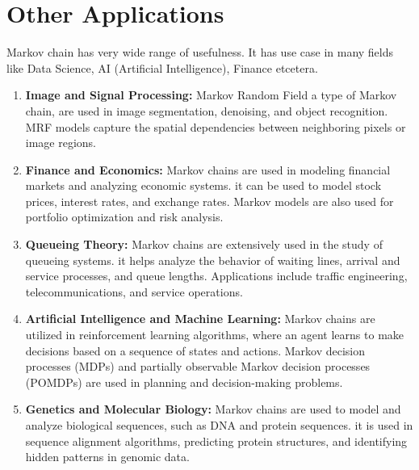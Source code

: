 \section{Other Applications}
Markov chain has very wide range of usefulness. It has use case in many fields like Data Science, AI (Artificial Intelligence), Finance etcetera.

\begin{enumerate}
    \item \textbf{Image and Signal Processing:}  Markov Random Field  a type of Markov chain, are used in image segmentation, denoising, and object recognition. 
        MRF models capture the spatial dependencies between neighboring pixels or image regions.
    \item \textbf{Finance and Economics:} Markov chains are used in modeling financial markets and analyzing economic systems. 
        it can be used to model stock prices, interest rates, and exchange rates. Markov models are also used for portfolio optimization and risk analysis.
    \item \textbf{Queueing Theory:} Markov chains are extensively used in the study of queueing systems. 
        it helps analyze the behavior of waiting lines, arrival and service processes, and queue lengths. 
        Applications include traffic engineering, telecommunications, and service operations.
    \item \textbf{Artificial Intelligence and Machine Learning:} Markov chains are utilized in reinforcement learning algorithms, 
        where an agent learns to make decisions based on a sequence of states and actions. 
        Markov decision processes (MDPs) and partially observable Markov decision processes (POMDPs) are used in planning and decision-making problems.
    \item \textbf{Genetics and Molecular Biology:} Markov chains are used to model and analyze biological sequences, such as DNA and protein sequences. 
        it is used in sequence alignment algorithms, predicting protein structures, and identifying hidden patterns in genomic data. 
\end{enumerate}
